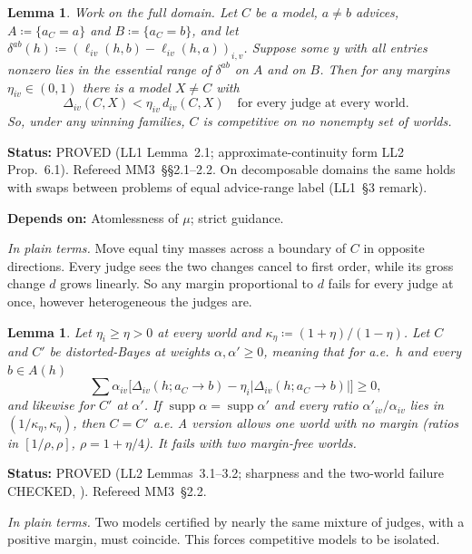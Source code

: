 \documentclass[11pt]{article}
\newtheorem{lemma}[theorem]{Lemma}
\theoremstyle{definition}
\theoremstyle{remark}
\newcommand{\supp}{\operatorname{supp}}
\newcommand{\src}[1]{\textsf{#1}}
\newcommand{\status}[1]{\par\smallskip\noindent\textbf{Status:} #1\par}
\newcommand{\deps}[1]{\noindent\textbf{Depends on:} #1\par}
\newcommand{\inwords}[1]{\noindent\textit{In plain terms.} #1\par\smallskip}
\begin{document}
\begin{lemma}\label{lem:swap}
Work on the full domain. Let $C$ be a model, $a\ne b$ advices, $A\coloneqq\{a_C=a\}$ and $B\coloneqq\{a_C=b\}$, and let $\delta^{ab}(h)\coloneqq(\ell_{iv}(h,b)-\ell_{iv}(h,a))_{i,v}$. Suppose some $y$ with all entries nonzero lies in the essential range of $\delta^{ab}$ on $A$ and on $B$. Then for any margins $\eta_{iv}\in(0,1)$ there is a model $X\ne C$ with
\[
\Delta_{iv}(C,X)<\eta_{iv}\,d_{iv}(C,X)\quad\text{for every judge at every world.}
\]
So, under any winning families, $C$ is competitive on no nonempty set of worlds.
\end{lemma}
\status{PROVED (\src{LL1} Lemma~2.1; approximate-continuity form \src{LL2} Prop.~6.1). Refereed \src{MM3}~\S\S2.1--2.2. On decomposable domains the same holds with swaps between problems of equal advice-range label (\src{LL1}~\S3 remark).}
\deps{Atomlessness of $\mu$; strict guidance.}
\inwords{Move equal tiny masses across a boundary of $C$ in opposite directions. Every judge sees the two changes cancel to first order, while its gross change $d$ grows linearly. So any margin proportional to $d$ fails for every judge at once, however heterogeneous the judges are.}

\begin{lemma}\label{lem:gap}
Let $\eta_i\ge\eta>0$ at every world and $\kappa_\eta\coloneqq(1+\eta)/(1-\eta)$. Let $C$ and $C'$ be distorted-Bayes at weights $\alpha,\alpha'\ge0$, meaning that for a.e.\ $h$ and every $b\in A(h)$
\[
\textstyle\sum\alpha_{iv}\bigl[\Delta_{iv}(h;a_C\to b)-\eta_i|\Delta_{iv}(h;a_C\to b)|\bigr]\ge0,
\]
and likewise for $C'$ at $\alpha'$. If $\supp\alpha=\supp\alpha'$ and every ratio $\alpha'_{iv}/\alpha_{iv}$ lies in $(1/\kappa_\eta,\kappa_\eta)$, then $C=C'$ a.e. A version allows one world with no margin (ratios in $[1/\rho,\rho]$, $\rho=1+\eta/4$). It fails with two margin-free worlds.
\end{lemma}
\status{PROVED (\src{LL2} Lemmas~3.1--3.2; sharpness and the two-world failure CHECKED, \file{ll2py/gap_check.out}). Refereed \src{MM3}~\S2.2.}
\inwords{Two models certified by nearly the same mixture of judges, with a positive margin, must coincide. This forces competitive models to be isolated.}
\end{document}
